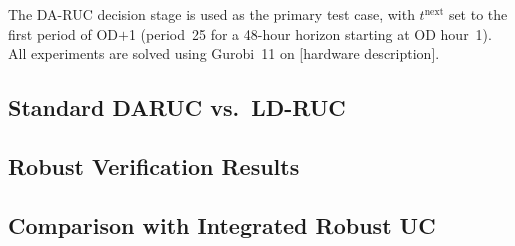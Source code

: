 \documentclass[journal]{IEEEtran}
\begin{document}
The DA-RUC decision stage is used as the primary test case, with
$t^{\text{next}}$ set to the first period of OD$+$1 (period~25 for a
48-hour horizon starting at OD hour~1).
All experiments are solved using Gurobi~11 on [hardware description].

\subsection{Standard DARUC vs.\ LD-RUC}\label{sec:results_daruc}


\subsection{Robust Verification Results}\label{sec:results_robust}


\subsection{Comparison with Integrated Robust UC}
\label{sec:results_aruc}

\end{document}
